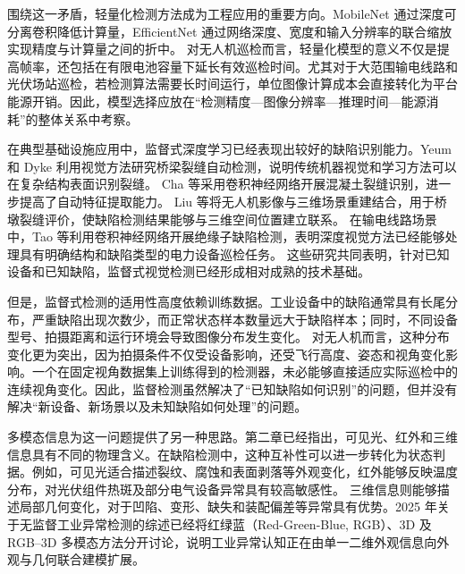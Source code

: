 围绕这一矛盾，轻量化检测方法成为工程应用的重要方向。MobileNet 通过深度可分离卷积降低计算量，EfficientNet 通过网络深度、宽度和输入分辨率的联合缩放实现精度与计算量之间的折中\cite{Howard2017MobileNet,Tan2019EfficientNet}。 对无人机巡检而言，轻量化模型的意义不仅是提高帧率，还包括在有限电池容量下延长有效巡检时间。尤其对于大范围输电线路和光伏场站巡检，若检测算法需要长时间运行，单位图像计算成本会直接转化为平台能源开销。因此，模型选择应放在“检测精度—图像分辨率—推理时间—能源消耗”的整体关系中考察。

在典型基础设施应用中，监督式深度学习已经表现出较好的缺陷识别能力。Yeum 和 Dyke 利用视觉方法研究桥梁裂缝自动检测，说明传统机器视觉和学习方法可以在复杂结构表面识别裂缝\cite{Yeum2015Vision,xiao2024bridgeroicrack}。 Cha 等采用卷积神经网络开展混凝土裂缝识别，进一步提高了自动特征提取能力\cite{Cha2017Deep,wang2024steelcorrosion}。 Liu 等将无人机影像与三维场景重建结合，用于桥墩裂缝评价，使缺陷检测结果能够与三维空间位置建立联系\cite{Liu2020BridgeCrack,maboudi2025bridgedeformation}。 在输电线路场景中，Tao 等利用卷积神经网络开展绝缘子缺陷检测，表明深度视觉方法已经能够处理具有明确结构和缺陷类型的电力设备巡检任务\cite{Tao2020Insulator,hang2024wtbcrack}。 这些研究共同表明，针对已知设备和已知缺陷，监督式视觉检测已经形成相对成熟的技术基础。

但是，监督式检测的适用性高度依赖训练数据。工业设备中的缺陷通常具有长尾分布，严重缺陷出现次数少，而正常状态样本数量远大于缺陷样本；同时，不同设备型号、拍摄距离和运行环境会导致图像分布发生变化\cite{Li2024Imbalance,Diers2023IJCVIQC}。 对无人机而言，这种分布变化更为突出，因为拍摄条件不仅受设备影响，还受飞行高度、姿态和视角变化影响。一个在固定视角数据集上训练得到的检测器，未必能够直接适应实际巡检中的连续视角变化。因此，监督检测虽然解决了“已知缺陷如何识别”的问题，但并没有解决“新设备、新场景以及未知缺陷如何处理”的问题。

多模态信息为这一问题提供了另一种思路。第二章已经指出，可见光、红外和三维信息具有不同的物理含义。在缺陷检测中，这种互补性可以进一步转化为状态判据。例如，可见光适合描述裂纹、腐蚀和表面剥落等外观变化，红外能够反映温度分布，对光伏组件热斑及部分电气设备异常具有较高敏感性\cite{Jadin2012Infrared,Usamentiaga2014Infrared,Ramirez2022PVRTK,santos2024uvthermopl,liu2025infraredcsee,ertunc2024thermalfault,li2024multispectraldefect}。 三维信息则能够描述局部几何变化，对于凹陷、变形、缺失和装配偏差等异常具有优势。2025 年关于无监督工业异常检测的综述已经将红绿蓝（Red-Green-Blue, RGB）、3D 及 RGB--3D 多模态方法分开讨论，说明工业异常认知正在由单一二维外观信息向外观与几何联合建模扩展\cite{Li2025RGB3D}。 

